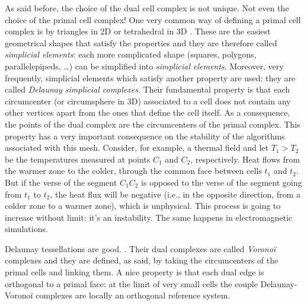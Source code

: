 As said before, the choice of the dual cell complex is not unique. Not
even the choice of the primal cell complex! One very common way of
defining a primal cell complex is by triangles in 2D or tetrahedral in
3D . These are the easiest geometrical shapes that satisfy the
properties  and they are therefore
called \emph{simplicial elements}: each more complicated shape
(squares, polygons, parallelepipeds, \ldots) can be simplified into
\emph{simplicial elements}. Moreover, very frequently, simplicial
elements which satisfy another property are used: they are called
\emph{Delaunay simplicial complexes}. Their fundamental property is
that each circumcenter (or circumsphere in 3D) associated to a cell
does not contain any other vertices apart from the ones that define
the cell itself. As a consequence, the points of the dual complex are
the circumcenters of the primal complex. This property has a very
important consequence on the stability of the algorithms associated
with this mesh. Consider, for example, a thermal field and let $T_1 >
T_2$ be the temperatures measured at points $C_1$ and $C_2$,
respectively. Heat flows from the warmer zone to the colder, through
the common face between cells $t_1$ and $t_2$. But if the verse of the
segment $C_1C_2$ is opposed to the verse of the segment going from
$t_1$ to $t_2$, the heat flux will be negative (i.e., in the opposite
direction, from a colder zone to a warmer zone), which is
unphysical. This process is going to increase without limit: it's an
instability. The same happens in electromagnetic simulations.


Delaunay tessellations are good. .
Their dual complexes are called \emph{Vorono\"i} complexes and they
are defined, as said, by taking the circumcenters of the primal cells
and linking them. A nice property is that each dual edge is orthogonal
to a primal face: at the limit of very small cells the couple
Delaunay-Vorono\"i complexes are locally an orthogonal reference
system.
  


